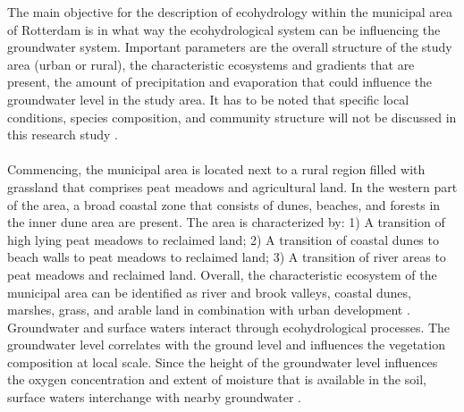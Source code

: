 The main objective for the description of ecohydrology within the municipal area of Rotterdam is in what way the ecohydrological system can be influencing the groundwater system. Important parameters are the overall structure of the study area (urban or rural), the characteristic ecosystems and gradients that are present, the amount of precipitation and evaporation that could influence the groundwater level in the study area. It has to be noted that specific local conditions, species composition, and community structure will not be discussed in this research study \cite{koomen-2011}.\\
\\
Commencing, the municipal area is located next to a rural region filled with grassland that comprises peat meadows and agricultural land. In the western part of the area, a broad coastal zone that consists of dunes, beaches, and forests in the inner dune area are present. The area is characterized by: 1) A transition of high lying peat meadows to reclaimed land; 2) A transition of coastal dunes to beach walls to peat meadows to reclaimed land; 3) A transition of river areas to peat meadows and reclaimed land. Overall, the characteristic ecosystem of the municipal area can be identified as river and brook valleys, coastal dunes, marshes, grass, and arable land in combination with urban development \cite{koomen-2011}. Groundwater and surface waters interact through ecohydrological processes. The groundwater level correlates with the ground level and influences the vegetation composition at local scale. Since the height of the groundwater level influences the oxygen concentration and extent of moisture that is available in the soil, surface waters interchange with nearby groundwater \cite{witte-2008}. 

